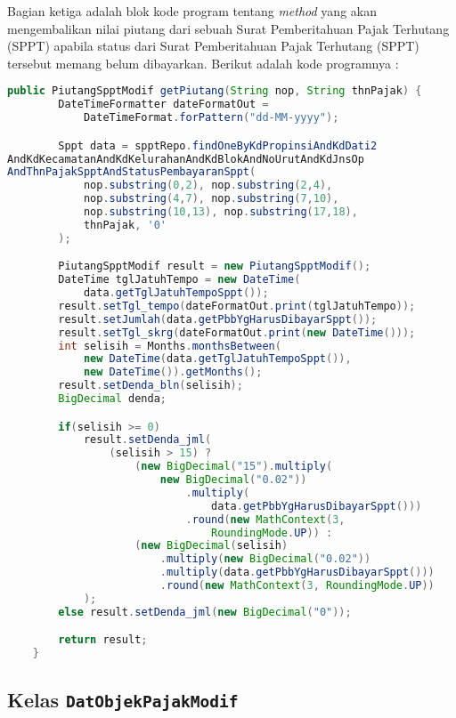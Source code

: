 \documentclass[pdftex,12pt, oneside]{article}
\begin{document}
Bagian ketiga adalah blok kode program tentang \textit{method} yang akan mengembalikan nilai piutang dari sebuah Surat Pemberitahuan Pajak Terhutang (SPPT) apabila status dari Surat Pemberitahuan Pajak Terhutang (SPPT) tersebut memang belum dibayarkan. Berikut adalah kode programnya :

\begin{lstlisting}[language=java]
    public PiutangSpptModif getPiutang(String nop, String thnPajak) {
        DateTimeFormatter dateFormatOut = 
            DateTimeFormat.forPattern("dd-MM-yyyy");

        Sppt data = spptRepo.findOneByKdPropinsiAndKdDati2
AndKdKecamatanAndKdKelurahanAndKdBlokAndNoUrutAndKdJnsOp
AndThnPajakSpptAndStatusPembayaranSppt(
            nop.substring(0,2), nop.substring(2,4), 
            nop.substring(4,7), nop.substring(7,10), 
            nop.substring(10,13), nop.substring(17,18), 
            thnPajak, '0'
        );

        PiutangSpptModif result = new PiutangSpptModif();
        DateTime tglJatuhTempo = new DateTime(
            data.getTglJatuhTempoSppt());
        result.setTgl_tempo(dateFormatOut.print(tglJatuhTempo));
        result.setJumlah(data.getPbbYgHarusDibayarSppt());
        result.setTgl_skrg(dateFormatOut.print(new DateTime()));
        int selisih = Months.monthsBetween(
            new DateTime(data.getTglJatuhTempoSppt()), 
            new DateTime()).getMonths();
        result.setDenda_bln(selisih);
        BigDecimal denda;

        if(selisih >= 0)
            result.setDenda_jml(
                (selisih > 15) ?
                    (new BigDecimal("15").multiply(
                        new BigDecimal("0.02"))
                            .multiply(
                                data.getPbbYgHarusDibayarSppt()))
                            .round(new MathContext(3, 
                                RoundingMode.UP)) :
                    (new BigDecimal(selisih)
                        .multiply(new BigDecimal("0.02"))
                        .multiply(data.getPbbYgHarusDibayarSppt()))
                        .round(new MathContext(3, RoundingMode.UP))
            );
        else result.setDenda_jml(new BigDecimal("0"));

        return result;
    }
\end{lstlisting}

\subsection{Kelas \texttt{DatObjekPajakModif}}
\end{document}
